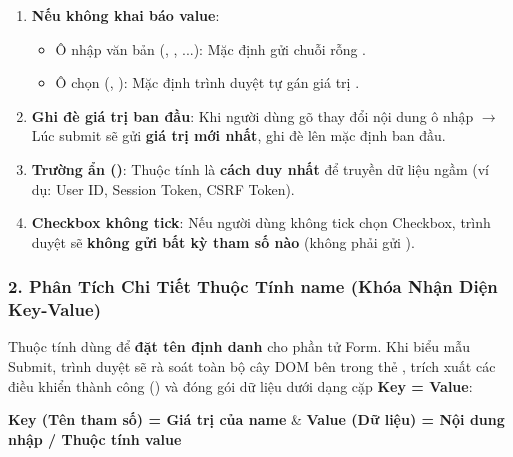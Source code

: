 \begin{warnBox}
\begin{enumerate}[leftmargin=1.5em, itemsep=4pt, parsep=0pt]
    \item \textbf{Nếu không khai báo value}:
    \begin{itemize}[leftmargin=1.2em]
        \item Ô nhập văn bản (, , ...): Mặc định gửi chuỗi rỗng .
        \item Ô chọn (, ): Mặc định trình duyệt tự gán giá trị .
    \end{itemize}
    \item \textbf{Ghi đè giá trị ban đầu}: Khi người dùng gõ thay đổi nội dung ô nhập $\rightarrow$ Lúc submit sẽ gửi \textbf{giá trị mới nhất}, ghi đè lên  mặc định ban đầu.
    \item \textbf{Trường ẩn ()}: Thuộc tính  là \textbf{cách duy nhất} để truyền dữ liệu ngầm (ví dụ: User ID, Session Token, CSRF Token).
    \item \textbf{Checkbox không tick}: Nếu người dùng không tick chọn Checkbox, trình duyệt sẽ \textbf{không gửi bất kỳ tham số nào} (không phải gửi ).
\end{enumerate}
\end{warnBox}

\subsubsection{2. Phân Tích Chi Tiết Thuộc Tính name (Khóa Nhận Diện Key-Value)}

\begin{conceptBox}[Định Nghĩa \& Cơ Chế Cặp Key = Value]
Thuộc tính  dùng để \textbf{đặt tên định danh} cho phần tử Form. Khi biểu mẫu Submit, trình duyệt sẽ rà soát toàn bộ cây DOM bên trong thẻ , trích xuất các điều khiển thành công () và đóng gói dữ liệu dưới dạng cặp \textbf{Key = Value}:
\begin{center}
\textbf{\textcolor{primaryBlue}{Key (Tên tham số)} = \textcolor{accentOrange}{Giá trị của name}} \quad \& \quad \textbf{\textcolor{primaryBlue}{Value (Dữ liệu)} = \textcolor{accentOrange}{Nội dung nhập / Thuộc tính value}}
\end{center}
\end{conceptBox}

